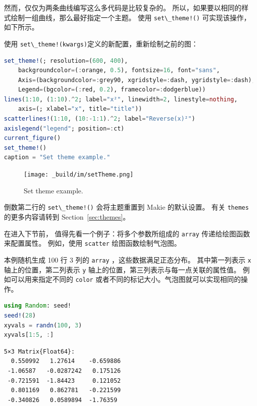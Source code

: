 \documentclass[
  notoc %
]{tufte-book}
\newcommand{\passthrough}[1]{#1}
\begin{document}
然而，仅仅为两条曲线编写这么多代码是比较复杂的。
所以，如果要以相同的样式绘制一组曲线，那么最好指定一个主题。 使用
\passthrough{\lstinline"set\_theme!()"} 可实现该操作，如下所示。

使用
\passthrough{\lstinline"set\_theme!(kwargs)"}定义的新配置，重新绘制之前的图：

\begin{lstlisting}[language=Julia]
set_theme!(; resolution=(600, 400),
    backgroundcolor=(:orange, 0.5), fontsize=16, font="sans",
    Axis=(backgroundcolor=:grey90, xgridstyle=:dash, ygridstyle=:dash),
    Legend=(bgcolor=(:red, 0.2), framecolor=:dodgerblue))
lines(1:10, (1:10).^2; label="x²", linewidth=2, linestyle=nothing,
    axis=(; xlabel="x", title="title"))
scatterlines!(1:10, (10:-1:1).^2; label="Reverse(x)²")
axislegend("legend"; position=:ct)
current_figure()
set_theme!()
caption = "Set theme example."
\end{lstlisting}

\begin{figure}
\hypertarget{fig:setTheme}{%
\centering
\texttt{[image: \_build/im/setTheme.png]}
\caption{Set theme example.}\label{fig:setTheme}
}
\end{figure}

倒数第二行的 \passthrough{\lstinline"set\_theme!()"} 会将主题重置到
Makie 的默认设置。 有关 \passthrough{\lstinline!themes!}
的更多内容请转到 Section~\ref{sec:themes}。

在进入下节前， 值得先看一个例子：将多个参数所组成的
\passthrough{\lstinline!array!} 传递给绘图函数来配置属性。 例如，使用
\passthrough{\lstinline!scatter!} 绘图函数绘制气泡图。

本例随机生成 100 行 3 列的 \passthrough{\lstinline!array!}
，这些数据满足正态分布。 其中第一列表示 \passthrough{\lstinline!x!}
轴上的位置，第二列表示 \passthrough{\lstinline!y!}
轴上的位置，第三列表示与每一点关联的属性值。 例如可以用来指定不同的
\passthrough{\lstinline!color!}
或者不同的标记大小。气泡图就可以实现相同的操作。

\begin{lstlisting}[language=Julia]
using Random: seed!
seed!(28)
xyvals = randn(100, 3)
xyvals[1:5, :]
\end{lstlisting}

\begin{lstlisting}[language=Output]
5×3 Matrix{Float64}:
  0.550992   1.27614    -0.659886
 -1.06587   -0.0287242   0.175126
 -0.721591  -1.84423     0.121052
  0.801169   0.862781   -0.221599
 -0.340826   0.0589894  -1.76359
\end{lstlisting}
\end{document}
